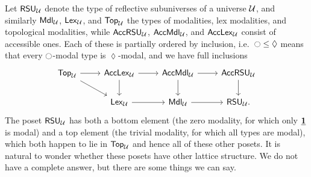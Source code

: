 Let $\rsu[\UU]$ denote the type of reflective subuniverses of a universe $\UU$, and similarly $\mdl[\UU]$, $\lex[\UU]$, and $\tpl[\UU]$ the types of modalities, lex modalities, and topological modalities, while $\accrsu$, $\accmdl$, and $\acclex$ consist of accessible ones.
Each of these is partially ordered by inclusion, i.e.\ $\modal \le \lozenge$ means that every $\modal$-modal type is $\lozenge$-modal, and we have full inclusions
\[
\begin{tikzcd}
  {\tpl} \arrow[r] \arrow[dr] & {\acclex} \arrow[r] \arrow[d] & {\accmdl} \arrow[r] \arrow[d] & {\accrsu} \arrow[d] \\
  & {\lex} \arrow[r] & {\mdl} \arrow[r] & {\rsu}.
\end{tikzcd}
\]
The poset $\rsu$ has both a bottom element (the zero modality, for which only $\unit$ is modal) and a top element (the trivial modality, for which all types are modal), which both happen to lie in $\tpl$ and hence all of these other posets.
It is natural to wonder whether these posets have other lattice structure.
We do not have a complete answer, but there are some things we can say.

